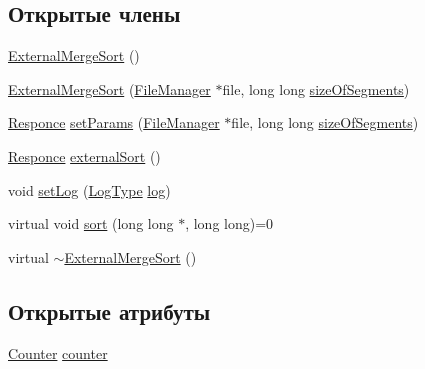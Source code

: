 \subsection*{Открытые члены}
\begin{DoxyCompactItemize}
\item 
\hyperlink{class_external_merge_sort_a7b6efcd2abbf59a8983f972c52d04650}{External\+Merge\+Sort} ()
\item 
\hyperlink{class_external_merge_sort_a37df182916b341d5466f2fff0d50dfed}{External\+Merge\+Sort} (\hyperlink{class_file_manager}{File\+Manager} $\ast$file, long long \hyperlink{class_external_merge_sort_a1d68bb5e0373cf16807a41272dff1a99}{size\+Of\+Segments})
\item 
\hyperlink{_structures_8h_a9864d6ef28dd6e38416afac4426b3491}{Responce} \hyperlink{class_external_merge_sort_a2a27571acdf4f42e34798663e37f5e0b}{set\+Params} (\hyperlink{class_file_manager}{File\+Manager} $\ast$file, long long \hyperlink{class_external_merge_sort_a1d68bb5e0373cf16807a41272dff1a99}{size\+Of\+Segments})
\item 
\hyperlink{_structures_8h_a9864d6ef28dd6e38416afac4426b3491}{Responce} \hyperlink{class_external_merge_sort_aa0d80e41effe3a13c0d63b33e208918f}{external\+Sort} ()
\item 
void \hyperlink{class_external_merge_sort_ac0eeaba67ee0703acf73a8a5bf78ebe1}{set\+Log} (\hyperlink{_structures_8h_af67907baa897e9fb84df0cb89795b87c}{Log\+Type} \hyperlink{class_external_merge_sort_a41f61c3beb7dc529d7f2a8b2b4ee380b}{log})
\item 
virtual void \hyperlink{class_external_merge_sort_af6412221cc797a846243a343ccc12dba}{sort} (long long $\ast$, long long)=0
\item 
virtual \hyperlink{class_external_merge_sort_adfee7073120e0ae832c96977440b2fb4}{$\sim$\+External\+Merge\+Sort} ()
\end{DoxyCompactItemize}
\subsection*{Открытые атрибуты}
\begin{DoxyCompactItemize}
\item 
\hyperlink{class_counter}{Counter} \hyperlink{class_external_merge_sort_ac9cb039a5cda56e66aecbc17465dd237}{counter}
\end{DoxyCompactItemize}

